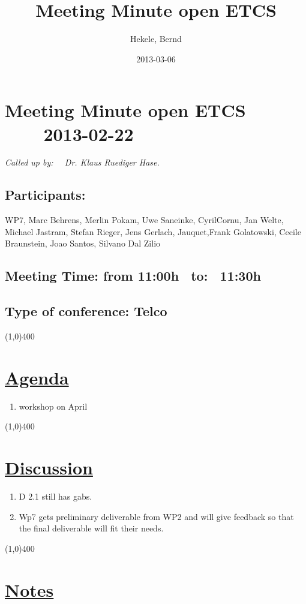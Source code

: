 \documentclass[a4paper]{article}
\title{Meeting Minute open ETCS}
\author{Hekele, Bernd}
\date{2013-03-06}
\begin{document}
\section*{\large{Meeting Minute open ETCS \ \ \ \ 2013-02-22}}

\large{\emph{Called up by: \ \  Dr. Klaus Ruediger Hase.}}

\subsection*{Participants:}WP7, Marc Behrens, Merlin Pokam, Uwe Saneinke, CyrilCornu, Jan Welte, Michael Jastram, Stefan Rieger, Jens Gerlach, Jauquet,Frank Golatowski, Cecile Braunstein,  Joao Santos, Silvano Dal Zilio \\

\subsection*{Meeting Time: from 11:00h \ to: \ 11:30h}
\subsection*{Type of conference: Telco}

\line(1,0){400}
\section*{\underline{Agenda}}
\begin{enumerate}

\item  workshop on April
\end{enumerate}
\line(1,0){400}
\section*{\underline{Discussion}}

\begin{enumerate}
\item  D 2.1 still has gabs.
\item Wp7 gets preliminary deliverable from WP2 and will give feedback so that the final deliverable will fit their needs.

\end{enumerate}

\line(1,0){400}
\section*{\underline{Notes}}
\end{document}
